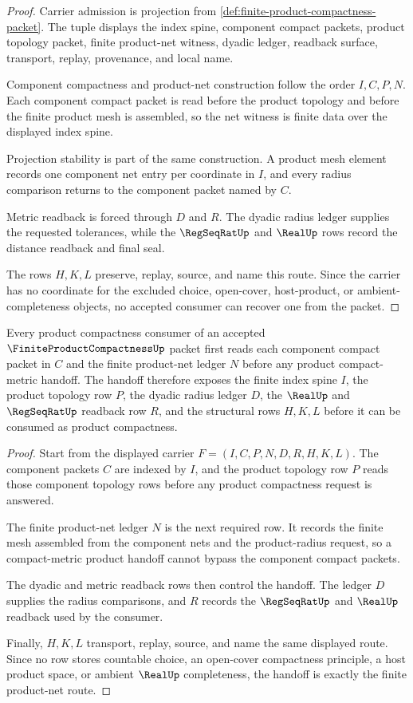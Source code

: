 \begin{proof}
Carrier admission is projection from \autoref{def:finite-product-compactness-packet}. The tuple displays the index spine, component compact packets, product topology packet, finite product-net witness, dyadic ledger, readback surface, transport, replay, provenance, and local name.

Component compactness and product-net construction follow the order $I,C,P,N$. Each component compact packet is read before the product topology and before the finite product mesh is assembled, so the net witness is finite data over the displayed index spine.

Projection stability is part of the same construction. A product mesh element records one component net entry per coordinate in $I$, and every radius comparison returns to the component packet named by $C$.

Metric readback is forced through $D$ and $R$. The dyadic radius ledger supplies the requested tolerances, while the $\RegSeqRatUp$ and $\RealUp$ rows record the distance readback and final seal.

The rows $H,K,L$ preserve, replay, source, and name this route. Since the carrier has no coordinate for the excluded choice, open-cover, host-product, or ambient-completeness objects, no accepted consumer can recover one from the packet.
\end{proof}

\begin{theorem}
\label{thm:finite-product-compactness-projection-net-handoff}
Every product compactness consumer of an accepted $\FiniteProductCompactnessUp$ packet first reads each component compact packet in $C$ and the finite product-net ledger $N$ before any product compact-metric handoff. The handoff therefore exposes the finite index spine $I$, the product topology row $P$, the dyadic radius ledger $D$, the $\RealUp$ and $\RegSeqRatUp$ readback row $R$, and the structural rows $H,K,L$ before it can be consumed as product compactness.
\end{theorem}
\begin{proof}
Start from the displayed carrier $F=(I,C,P,N,D,R,H,K,L)$. The component packets $C$ are indexed by $I$, and the product topology row $P$ reads those component topology rows before any product compactness request is answered.

The finite product-net ledger $N$ is the next required row. It records the finite mesh assembled from the component nets and the product-radius request, so a compact-metric product handoff cannot bypass the component compact packets.

The dyadic and metric readback rows then control the handoff. The ledger $D$ supplies the radius comparisons, and $R$ records the $\RegSeqRatUp$ and $\RealUp$ readback used by the consumer.

Finally, $H,K,L$ transport, replay, source, and name the same displayed route. Since no row stores countable choice, an open-cover compactness principle, a host product space, or ambient $\RealUp$ completeness, the handoff is exactly the finite product-net route.
\end{proof}

